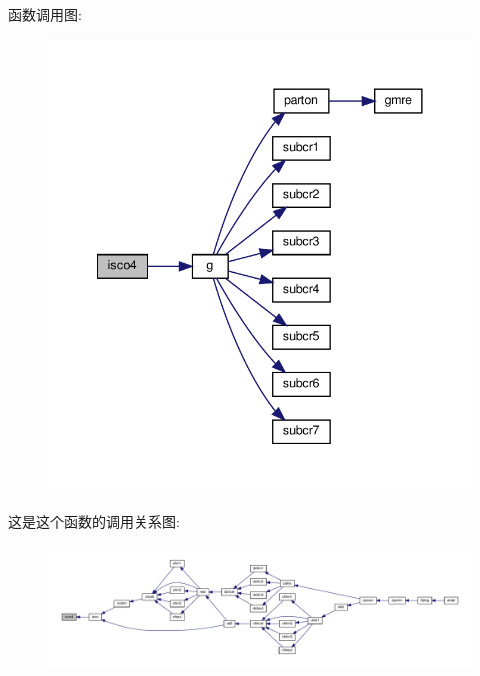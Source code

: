 函数调用图\+:
\nopagebreak
\begin{figure}[H]
\begin{center}
\leavevmode
\includegraphics[width=341pt]{isco4_8f90_a70a766e747f84724c99301dba9dcbae8_cgraph}
\end{center}
\end{figure}
这是这个函数的调用关系图\+:
\nopagebreak
\begin{figure}[H]
\begin{center}
\leavevmode
\includegraphics[width=350pt]{isco4_8f90_a70a766e747f84724c99301dba9dcbae8_icgraph}
\end{center}
\end{figure}
